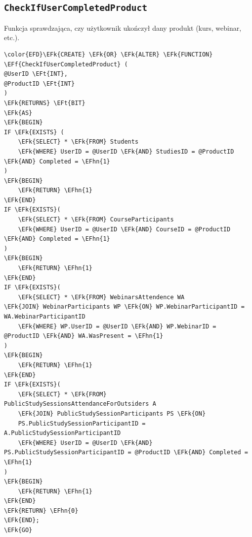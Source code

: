 \documentclass[11pt]{article}
\newcommand{\EFk}[1]{\textcolor{EFk}{\textbf{#1}}} %
\newcommand{\EFf}[1]{\textcolor{EFf}{#1}} %
\newcommand{\EFt}[1]{\textcolor{EFt}{\textbf{#1}}} %
\newcommand{\EFhn}[1]{\textcolor{EFhn}{#1}} %
\begin{document}
\subsection{\texttt{CheckIfUserCompletedProduct}}
\label{sec:org2a59fb2}
Funkcja sprawdzająca, czy użytkownik ukończył dany produkt (kurs, webinar, etc.).
\begin{Code}
\begin{Verbatim}
\color{EFD}\EFk{CREATE} \EFk{OR} \EFk{ALTER} \EFk{FUNCTION} \EFf{CheckIfUserCompletedProduct} (
@UserID \EFt{INT},
@ProductID \EFt{INT}
)
\EFk{RETURNS} \EFt{BIT}
\EFk{AS}
\EFk{BEGIN}
IF \EFk{EXISTS} (
    \EFk{SELECT} * \EFk{FROM} Students
    \EFk{WHERE} UserID = @UserID \EFk{AND} StudiesID = @ProductID  \EFk{AND} Completed = \EFhn{1}
)
\EFk{BEGIN}
    \EFk{RETURN} \EFhn{1}
\EFk{END}
IF \EFk{EXISTS}(
    \EFk{SELECT} * \EFk{FROM} CourseParticipants
    \EFk{WHERE} UserID = @UserID \EFk{AND} CourseID = @ProductID  \EFk{AND} Completed = \EFhn{1}
)
\EFk{BEGIN}
    \EFk{RETURN} \EFhn{1}
\EFk{END}
IF \EFk{EXISTS}(
    \EFk{SELECT} * \EFk{FROM} WebinarsAttendence WA
\EFk{JOIN} WebinarParticipants WP \EFk{ON} WP.WebinarParticipantID = WA.WebinarParticipantID
    \EFk{WHERE} WP.UserID = @UserID \EFk{AND} WP.WebinarID = @ProductID \EFk{AND} WA.WasPresent = \EFhn{1}
)
\EFk{BEGIN}
    \EFk{RETURN} \EFhn{1}
\EFk{END}
IF \EFk{EXISTS}(
    \EFk{SELECT} * \EFk{FROM} PublicStudySessionsAttendanceForOutsiders A
    \EFk{JOIN} PublicStudySessionParticipants PS \EFk{ON}
    PS.PublicStudySessionParticipantID = A.PublicStudySessionParticipantID
    \EFk{WHERE} UserID = @UserID \EFk{AND} PS.PublicStudySessionParticipantID = @ProductID \EFk{AND} Completed = \EFhn{1}
)
\EFk{BEGIN}
    \EFk{RETURN} \EFhn{1}
\EFk{END}
\EFk{RETURN} \EFhn{0}
\EFk{END};
\EFk{GO}
\end{Verbatim}
\end{Code}
\end{document}
